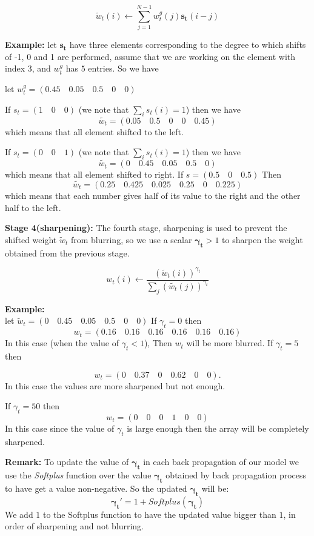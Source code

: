 \documentclass{amsart}
\numberwithin{equation}{section}
\theoremstyle{definition}
\theoremstyle{remark}
\begin{document}
$$\tilde{w}_t(i)\leftarrow \sum_{j=1}^{N-1} w_t^g(j)\bm{s_t}(i-j)$$

\textbf{Example:} let $\bm{s_t}$ have three elements corresponding to the degree to which shifts of -1, 0 and 1 are performed, assume that we are working on the element with  index $3$,  and $w_t^g$ has $5$ entries. So we have


let $w_t^g= (0.45 \quad 0.05 \quad 0.5 \quad 0 \quad 0)$

If $s_t= (1 \quad 0\quad 0)$ (we note that $\sum_i s_t(i)=1$) then we have
$$\tilde{w_t}= ( 0.05 \quad 0.5 \quad 0\quad 0 \quad 0.45)$$ which means that all element shifted to the left.

If $s_t= (0 \quad 0\quad 1)$ (we note that $\sum_i s_t(i)=1$) then we have
$$\tilde{w_t}=  (0\quad 0.45 \quad 0.05 \quad 0.5 \quad 0)$$ which means that all element shifted to right.
If $s=(0.5\quad0\quad  0.5)$
Then $$\tilde{w_t}= (0.25\quad 0.425 \quad 0.025\quad  0.25 \quad 0 \quad 0.225)$$
which means that each number gives half of its value to the right and the other half to the left.

\textbf{Stage 4(sharpening):} The fourth stage, sharpening is used to prevent the shifted weight $\tilde{w}_t$ from blurring, so we use a scalar $\bm{\gamma_t}>1$ to sharpen the weight obtained from the previous stage.

$$w_t(i) \leftarrow \frac{\left(\tilde{w}_t(i)\right)^{\gamma_t}}{\sum_j \left(\tilde{w_t}(j)\right)^{\gamma_t}}$$

\textbf{Example:}\\
let $\tilde w_t = (0\quad 0.45 \quad 0.05 \quad 0.5 \quad 0\quad 0)$
If $\gamma_t= 0$ then
$$w_t= (0.16 \quad 0.16 \quad 0.16\quad 0.16 \quad 0.16 \quad 0.16)$$
In this case (when the value of $\gamma_t <1$), Then $w_t$ will be more blurred.
If $\gamma_t =5$ then

$$w_t= (0 \quad 0.37 \quad 0 \quad 0.62 \quad 0 \quad 0).$$
In this case the values are more sharpened but not enough.

If $\gamma_t=50$ then
$$w_t= (0\quad 0\quad 0\quad 1\quad 0\quad 0)$$
In this case since the value of $\gamma_t$ is large enough then the array will be completely sharpened.

\textbf{Remark:} To update the value of $\bm{\gamma_t}$ in each back propagation of our model we use the \textit{Softplus} function over the value $\bm{\gamma_t}$ obtained by back propagation process to have get a value non-negative. So the updated $\bm{\gamma_t}$ will be:
$$\bm{\gamma_t'}=1+Softplus(\bm{\gamma_t})$$
We add $1$ to the Softplus function to have the updated value bigger than $1$, in order of sharpening and not blurring. \\
\end{document}
